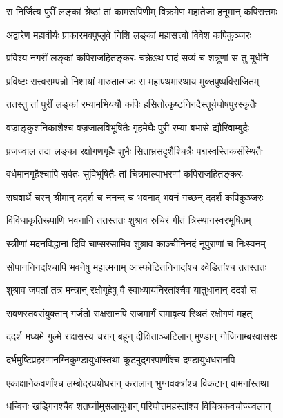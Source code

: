 
\twolineshloka
{स निर्जित्य पुरीं लङ्कां श्रेष्ठां तां कामरूपिणीम्}
{विक्रमेण महातेजा हनूमान् कपिसत्तमः} %

\twolineshloka
{अद्वारेण महावीर्यः प्राकारमवपुप्लुवे}
{निशि लङ्कां महासत्त्वो विवेश कपिकुञ्जरः} %

\twolineshloka
{प्रविश्य नगरीं लङ्कां कपिराजहितङ्करः}
{चक्रेऽथ पादं सव्यं च शत्रूणां स तु मूर्धनि} %

\twolineshloka
{प्रविष्टः सत्त्वसम्पन्नो निशायां मारुतात्मजः}
{स महापथमास्थाय मुक्तपुष्पविराजितम्} %

\twolineshloka
{ततस्तु तां पुरीं लङ्कां रम्यामभिययौ कपिः}
{हसितोत्कृष्टनिनदैस्तूर्यघोषपुरस्कृतैः} %

\twolineshloka
{वज्राङ्कुशनिकाशैश्च वज्रजालविभूषितैः}
{गृहमेघैः पुरी रम्या बभासे द्यौरिवाम्बुदैः} %

\twolineshloka
{प्रजज्वाल तदा लङ्का रक्षोगणगृहैः शुभैः}
{सिताभ्रसदृशैश्चित्रैः पद्मस्वस्तिकसंस्थितैः} %

\twolineshloka
{वर्धमानगृहैश्चापि सर्वतः सुविभूषितैः}
{तां चित्रमाल्याभरणां कपिराजहितङ्करः} %

\twolineshloka
{राघवार्थे चरन् श्रीमान् ददर्श च ननन्द च}
{भवनाद् भवनं गच्छन् ददर्श कपिकुञ्जरः} %

\twolineshloka
{विविधाकृतिरूपाणि भवनानि ततस्ततः}
{शुश्राव रुचिरं गीतं त्रिस्थानस्वरभूषितम्} %

\twolineshloka
{स्त्रीणां मदनविद्धानां दिवि चाप्सरसामिव}
{शुश्राव काञ्चीनिनदं नूपुराणां च निःस्वनम्} %

\twolineshloka
{सोपाननिनदांश्चापि भवनेषु महात्मनाम्}
{आस्फोटितनिनादांश्च क्ष्वेडितांश्च ततस्ततः} %

\twolineshloka
{शुश्राव जपतां तत्र मन्त्रान् रक्षोगृहेषु वै}
{स्वाध्यायनिरतांश्चैव यातुधानान् ददर्श सः} %

\twolineshloka
{रावणस्तवसंयुक्तान् गर्जतो राक्षसानपि}
{राजमार्गं समावृत्य स्थितं रक्षोगणं महत्} %

\twolineshloka
{ददर्श मध्यमे गुल्मे राक्षसस्य चरान् बहून्}
{दीक्षिताञ्जटिलान् मुण्डान् गोजिनाम्बरवाससः} %

\twolineshloka
{दर्भमुष्टिप्रहरणानग्निकुण्डायुधांस्तथा}
{कूटमुद्गरपाणींश्च दण्डायुधधरानपि} %

\twolineshloka
{एकाक्षानेकवर्णांश्च लम्बोदरपयोधरान्}
{करालान् भुग्नवक्त्रांश्च विकटान् वामनांस्तथा} %

\twolineshloka
{धन्विनः खड्गिनश्चैव शतघ्नीमुसलायुधान्}
{परिघोत्तमहस्तांश्च विचित्रकवचोज्ज्वलान्} %

